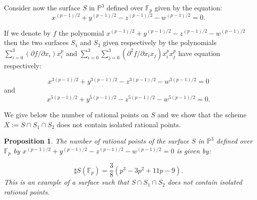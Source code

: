 \documentclass[12pt]{amsart}
\newtheorem{proposition}[lemma]{Proposition}
\theoremstyle{definition}
\begin{document}


Consider now the surface $S$ in ${\mathbb P}^3$ defined over ${\mathbb F}_p$ given by the equation:
$$x^{(p-1)/2} + y^{(p-1)/2} -z^{(p-1)/2} -w^{(p-1)/2}=0.  $$

If we denote by $f$ the polynomial $x^{(p-1)/2} + y^{(p-1)/2} -z^{(p-1)/2} -w^{(p-1)/2}$ then
the two surfaces $S_1$ and $S_2$ given respectively by the polynomials
 $\sum_{i=0}^3(\partial f/\partial x_i)x_i^p$ and 
$\sum_{i=0}^3\sum_{j=0}^3(\partial^2 f/\partial x_ix_j)x_i^px_j^p$ have equation respectively:

$$x^{3(p-1)/2} + y^{3(p-1)/2} -z^{3(p-1)/2} -w^{3(p-1)/2}=0$$
and
$$x^{5(p-1)/2} + y^{5(p-1)/2} -z^{5(p-1)/2} -w^{5(p-1)/2}=0.$$

We give below the number of rational points on $S$ and we show that the scheme $X:=S\cap S_1\cap S_2$ does not contain isolated rational points.
\begin{proposition}
The number of rational points of the surface $S$ in ${\mathbb P}^3$ defined over ${\mathbb F}_p$  by 
$x^{(p-1)/2} + y^{(p-1)/2} -z^{(p-1)/2} -w^{(p-1)/2}=0$ is given by:

$$\sharp S({\mathbb F}_p)=\frac{3}{8}(p^3-3p^2+11p-9).$$
This is an example of a surface such that $S\cap S_1\cap S_2$ does not contain isolated rational points.
\end{proposition}
\end{document}
